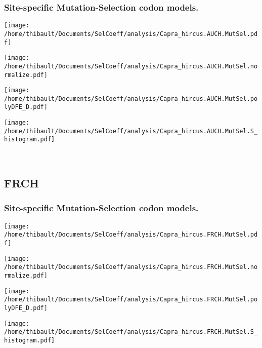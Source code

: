 \subsubsection*{Site-specific Mutation-Selection codon models.} 
\begin{minipage}{0.49\linewidth} 
\texttt{[image: /home/thibault/Documents/SelCoeff/analysis/Capra\_hircus.AUCH.MutSel.pdf]} 
\end{minipage}
\begin{minipage}{0.49\linewidth} 
\texttt{[image: /home/thibault/Documents/SelCoeff/analysis/Capra\_hircus.AUCH.MutSel.normalize.pdf]} 
\end{minipage}
\begin{minipage}{0.49\linewidth} 
\texttt{[image: /home/thibault/Documents/SelCoeff/analysis/Capra\_hircus.AUCH.MutSel.polyDFE\_D.pdf]} 
\end{minipage}
\begin{minipage}{0.49\linewidth} 
\texttt{[image: /home/thibault/Documents/SelCoeff/analysis/Capra\_hircus.AUCH.MutSel.S\_histogram.pdf]} 
\end{minipage}
\\ 
\subsection{FRCH} 
 
\subsubsection*{Site-specific Mutation-Selection codon models.} 
\begin{minipage}{0.49\linewidth} 
\texttt{[image: /home/thibault/Documents/SelCoeff/analysis/Capra\_hircus.FRCH.MutSel.pdf]} 
\end{minipage}
\begin{minipage}{0.49\linewidth} 
\texttt{[image: /home/thibault/Documents/SelCoeff/analysis/Capra\_hircus.FRCH.MutSel.normalize.pdf]} 
\end{minipage}
\begin{minipage}{0.49\linewidth} 
\texttt{[image: /home/thibault/Documents/SelCoeff/analysis/Capra\_hircus.FRCH.MutSel.polyDFE\_D.pdf]} 
\end{minipage}
\begin{minipage}{0.49\linewidth} 
\texttt{[image: /home/thibault/Documents/SelCoeff/analysis/Capra\_hircus.FRCH.MutSel.S\_histogram.pdf]} 
\end{minipage}
\\ 
